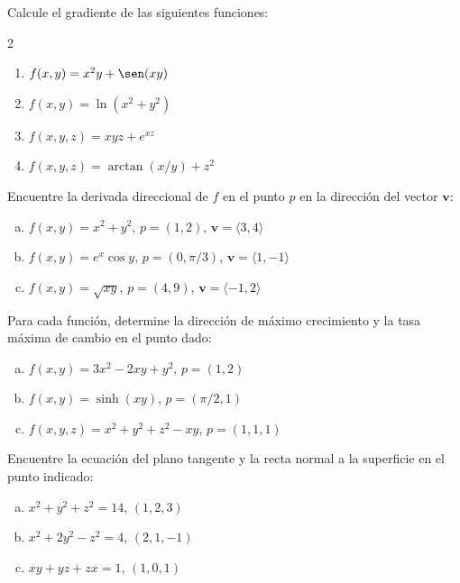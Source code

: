 \begin{prob}
Calcule el gradiente de las siguientes funciones:
\begin{multicols}{2}
\begin{enumerate}
    \item $f(x,y) = x^2 y + \sen(xy)$
    \item $f(x,y) = \ln(x^2 + y^2)$
    \item $f(x,y,z) = xyz + e^{xz}$
    \item $f(x,y,z) = \arctan(x/y) + z^2$
\end{enumerate}
\end{multicols}
\end{prob}

\begin{prob}
Encuentre la derivada direccional de $f$ en el punto $p$ en la dirección
del vector $\mathbf{v}$:
\begin{enumerate}[a)]
    \item $f(x,y) = x^2 + y^2$, $p=(1,2)$, $\mathbf{v} = \langle 3,4 \rangle$
    \item $f(x,y) = e^x \cos y$, $p=(0,\pi/3)$, $\mathbf{v} = \langle 1,-1 \rangle$
    \item $f(x,y) = \sqrt{xy}$, $p=(4,9)$, $\mathbf{v} = \langle -1,2 \rangle$
\end{enumerate}
\end{prob}

\begin{prob}
Para cada función, determine la dirección de máximo crecimiento y la tasa
máxima de cambio en el punto dado:
\begin{enumerate}[a)]
    \item $f(x,y) = 3x^2 - 2xy + y^2$, $p=(1,2)$
    \item $f(x,y) = \sinh(xy)$, $p=(\pi/2,1)$
    \item $f(x,y,z) = x^2 + y^2 + z^2 - xy$, $p=(1,1,1)$
\end{enumerate}
\end{prob}

\begin{prob}
Encuentre la ecuación del plano tangente y la recta normal a la
superficie en el punto indicado:
\begin{enumerate}[a)]
    \item $x^2 + y^2 + z^2 = 14$, $(1,2,3)$
    \item $x^2 + 2y^2 - z^2 = 4$, $(2,1,-1)$
    \item $xy + yz + zx = 1$, $(1,0,1)$
\end{enumerate}
\end{prob}

